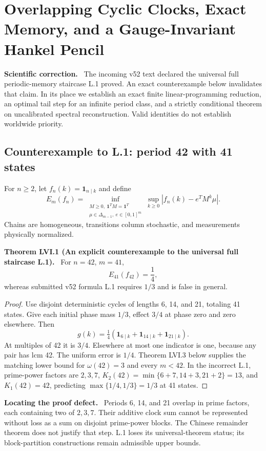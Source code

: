 \documentclass[11pt,a4paper,oneside]{book}
\newcommand{\one}{\mathbf 1}\newcommand{\ii}{\mathrm i}\newcommand{\dd}{\mathrm d}
\newcommand{\statement}[3]{\par\medskip\noindent\textbf{#1 #2 (#3).}\ }
\newcommand{\note}[1]{\par\medskip\noindent\textbf{#1}\ }
\begin{document}
\chapter{Overlapping Cyclic Clocks, Exact Memory, and a Gauge-Invariant Hankel Pencil}
\note{Scientific correction.} The incoming v52 text declared the universal full periodic-memory staircase L.1 proved. An exact counterexample below invalidates that claim. In its place we establish an exact finite linear-programming reduction, an optimal tail step for an infinite period class, and a strictly conditional theorem on uncalibrated spectral reconstruction. Valid identities do not establish worldwide priority.
\section{Counterexample to L.1: period 42 with 41 states}
For $n\ge2$, let $f_n(k)=\one_{n\mid k}$ and define
\begin{equation}E_m(f_n)=\inf_{\substack{M\ge0,\ \one^TM=\one^T\\\mu\in\Delta_{m-1},\ e\in[0,1]^m}}\sup_{k\ge0}|f_n(k)-e^TM^k\mu|.\tag{337}\end{equation}
Chains are homogeneous, transitions column stochastic, and measurements physically normalized.
\statement{Theorem}{LVI.1}{An explicit counterexample to the universal full staircase L.1}
For $n=42$, $m=41$,
\begin{equation}E_{41}(f_{42})=\frac14,\tag{338}\end{equation}
whereas submitted v52 formula L.1 requires $1/3$ and is false in general.
\begin{proof}
Use disjoint deterministic cycles of lengths 6, 14, and 21, totaling 41 states. Give each initial phase mass $1/3$, effect $3/4$ at phase zero and zero elsewhere. Then
\begin{equation}g(k)=\tfrac14(\one_{6\mid k}+\one_{14\mid k}+\one_{21\mid k}).\tag{339}\end{equation}
At multiples of 42 it is $3/4$. Elsewhere at most one indicator is one, because any pair has lcm 42. The uniform error is $1/4$. Theorem LVI.3 below supplies the matching lower bound for $\omega(42)=3$ and every $m<42$. In the incorrect L.1, prime-power factors are $2,3,7$, $K_2(42)=\min\{6+7,14+3,21+2\}=13$, and $K_1(42)=42$, predicting $\max\{1/4,1/3\}=1/3$ at 41 states.
\end{proof}
\note{Locating the proof defect.} Periods 6, 14, and 21 overlap in prime factors, each containing two of $2,3,7$. Their additive clock sum cannot be represented without loss as a sum on disjoint prime-power blocks. The Chinese remainder theorem does not justify that step. L.1 loses its universal-theorem status; its block-partition constructions remain admissible upper bounds.
\end{document}
